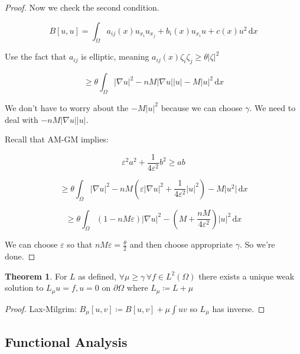 \documentclass{article}
\theoremstyle{definition}
\newtheorem{theorem}{Theorem}
\begin{document}
\begin{proof}
    Now we check the second condition. 

    \[
        B[u,u] = \int_{\Omega}^{} a_{ij} (x) u_{x_i} u_{x_j} + b_i(x) u_{x_i} u + c(x) u^2 \,\mathrm{d}x 
    \]

    Use the fact that \(a_{ij}\) is elliptic, meaning \(a_{ij}(x)\zeta_i \zeta_j \geq \theta \vert \zeta \vert ^2\) 

    \[
        \geq  \theta \int_\Omega \vert \nabla u \vert ^ 2 - n M \vert \nabla u \vert \vert u \vert - M \vert u \vert^2 \, \mathrm{d}x
    \]

    We don't have to worry about the \(-M \vert u \vert ^2\) because we can choose \(\gamma\). We need to deal with \(-nM \vert \nabla u \vert \vert u \vert\).

    Recall that AM-GM implies:

    \[
        \varepsilon^2 a^2 + \frac{1}{4 \varepsilon^2} b^2 \geq ab
    \]

    \[
        \geq \theta \int_{\Omega}^{} \vert \nabla u \vert ^2 - nM \left( \varepsilon \vert \nabla u \vert ^2 + \frac{1}{4 \varepsilon^2} \vert u \vert ^2 \right) -  M\vert u^2 \vert  \,\mathrm{d}x 
    \]

    \[
        \geq \theta \int_{\Omega}^{} \left( 1 - nM\varepsilon \right) \vert \nabla u \vert ^2 - \left( M + \frac{nM}{4 \varepsilon^2} \right) \vert u \vert ^2 \,\mathrm{d}x 
    \]

    We can choose \(\varepsilon\) so that \(n M \varepsilon = \frac{\theta}{2}\) and then choose appropriate \(\gamma\). So we're done.

\end{proof}

\begin{theorem}
    For \(L\) as defined, \(\forall \mu \geq \gamma \, \forall f\in L^2(\Omega)\) there exists a unique weak solution to \(L_\mu u = f, u = 0\) on \(\partial \Omega\) where \(L_\mu \coloneqq L + \mu\)  
\end{theorem}

\begin{proof}
    Lax-Milgrim: \(B_\mu [u,v] \coloneqq  B[u,v] + \mu \int uv\) so \(L_\mu\) has inverse.
\end{proof}

\subsection*{Functional Analysis}
\end{document}
